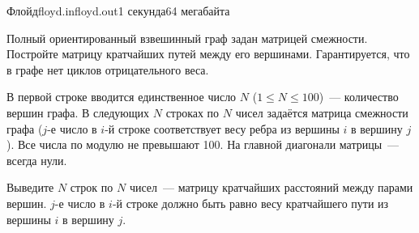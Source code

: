 \begin{problem}{Флойд}{floyd.in}{floyd.out}{1 секунда}{64 мегабайта}

Полный ориентированный взвешинный граф задан матрицей смежности.
Постройте матрицу кратчайших путей между его вершинами.
Гарантируется, что в графе нет циклов отрицательного веса.

\InputFile

В первой строке вводится единственное число $N$ ($1 \le N \le 100$)~---
количество вершин графа.
В следующих $N$ строках по $N$ чисел задаётся матрица смежности графа
($j$-е число в $i$-й строке соответствует весу ребра из вершины $i$ в вершину
$j$). Все числа по модулю не превышают 100. На главной диагонали матрицы~---
всегда нули.

\OutputFile

Выведите $N$ строк по $N$ чисел~--- матрицу кратчайших расстояний между парами
вершин. $j$-е число в $i$-й строке должно быть равно весу кратчайшего пути
из вершины $i$ в вершину $j$.

\Example

\begin{example}
%
\end{example}

\end{problem}


